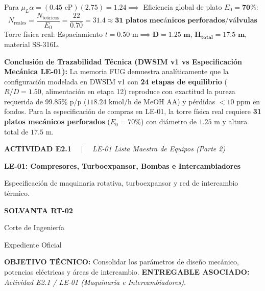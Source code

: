\documentclass[10pt,landscape]{article}
\newcommand{\slideheader}[4]{%
  \noindent
  \begin{minipage}[c]{0.78\textwidth}
    {\fontsize{7pt}{8.5pt}\selectfont \textbf{\color{accentcyan}#1} \ \ $|$ \ \ \textit{\color{black!70}#2}}\par
    \vspace{1.5pt}
    {\fontsize{12pt}{14pt}\selectfont \textbf{\color{navyblue}#3}}\par
    \vspace{1.5pt}
    {\fontsize{7.2pt}{8.8pt}\selectfont \color{black!80}#4}
  \end{minipage}
  \hfill
  \begin{minipage}[c]{0.20\textwidth}
    \begin{tcolorbox}[colback=navyblue,colframe=navyblue,arc=1.5mm,boxrule=0pt,top=2.5pt,bottom=2.5pt,left=4pt,right=4pt]
      \centering
      {\color{white}\fontsize{7.5pt}{9pt}\selectfont \textbf{SOLVANTA RT-02}}\par
      \vspace{1pt}
      {\color{accentcyan}\fontsize{6pt}{7.5pt}\selectfont Corte de Ingeniería}\par
      {\color{white!80}\fontsize{5.5pt}{7pt}\selectfont Expediente Oficial}
    \end{tcolorbox}
  \end{minipage}
  \par\vspace{2pt}
  \noindent{\color{navyblue}\rule{\textwidth}{1.0pt}}
  \par\vspace{2pt}
}
\newenvironment{objectivebox}[2]{%
  \begin{tcolorbox}[
    colback=softblue,
    colframe=accentcyan,
    arc=1.5mm,
    boxrule=0.7pt,
    top=2pt,
    bottom=2pt,
    left=6pt,
    right=6pt
  ]
    \noindent
    \textbf{\fontsize{6.5pt}{7.8pt}\selectfont \color{navyblue}OBJETIVO TÉCNICO:} 
    {\fontsize{6.5pt}{7.8pt}\selectfont #1}
    \hfill
    \textbf{\fontsize{6.5pt}{7.8pt}\selectfont \color{navyblue}ENTREGABLE ASOCIADO:} 
    {\fontsize{6.5pt}{7.8pt}\selectfont \textit{#2}}
  \end{tcolorbox}
  \vspace{1.5pt}
}{}
\begin{document}
\begin{minipage}[t]{0.488\textwidth}
\begin{tcolorbox}[colback=white,colframe=navyblue,arc=1.5mm,boxrule=0.7pt,top=3pt,bottom=3pt,left=6pt,right=6pt,height=0.52\textheight]
    Para $\mu_L \alpha = (0.45\text{ cP})(2.75) = 1.24 \implies$ Eficiencia global de plato $E_0 = \mathbf{70\%}$:
    \begin{equation*}
      N_{\text{reales}} = \frac{N_{\text{teóricos}}}{E_0} = \frac{22}{0.70} = \mathbf{31.4 \approx 31\text{ platos mecánicos perforados/válvulas}}
    \end{equation*}
    Torre física real: Espaciamiento $t = 0.50\text{ m} \implies \mathbf{D = 1.25\text{ m}}$, $\mathbf{H_{\text{total}} = 17.5\text{ m}}$, material SS-316L.
  \end{tcolorbox}
\end{minipage}

\vspace{2pt}

\begin{tcolorbox}[colback=softblue,colframe=accentcyan!60,arc=1mm,boxrule=0.6pt,top=2pt,bottom=2pt,left=6pt,right=6pt]
  \scriptsize
  \textbf{\color{navyblue}Conclusión de Trazabilidad Técnica (DWSIM v1 vs Especificación Mecánica LE-01):} 
  La memoria FUG demuestra analíticamente que la configuración modelada en DWSIM v1 con \textbf{24 etapas de equilibrio} ($R/D = 1.50$, alimentación en etapa 12) reproduce con exactitud la pureza requerida de 99.85\% p/p ($118.24\text{ kmol/h}$ de MeOH AA) y pérdidas $< 10\text{ ppm}$ en fondos. Para la especificación de compras en LE-01, la torre física real requiere \textbf{31 platos mecánicos perforados} ($E_0 = 70\%$) con diámetro de $1.25\text{ m}$ y altura total de $17.5\text{ m}$.
\end{tcolorbox}

\newpage

\slideheader{ACTIVIDAD E2.1}{LE-01 Lista Maestra de Equipos (Parte 2)}{LE-01: Compresores, Turboexpansor, Bombas e Intercambiadores}{Especificación de maquinaria rotativa, turboexpansor y red de intercambio térmico.}

\begin{objectivebox}{Consolidar los parámetros de diseño mecánico, potencias eléctricas y áreas de intercambio.}{Actividad E2.1 / LE-01 (Maquinaria e Intercambiadores).}
\end{objectivebox}

\vspace{1.5pt}
\end{document}
